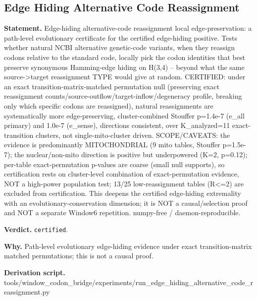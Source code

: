 \subsection{Edge Hiding Alternative Code Reassignment}\label{sec:bridge-edge-hiding-alternative-code-reassignment}
\textbf{Statement.} Edge-hiding alternative-code reassignment local edge-preservation: a path-level evolutionary
certificate for the certified edge-hiding positive. Tests whether natural NCBI alternative
genetic-code variants, when they reassign codons relative to the standard code, locally pick the
codon identities that best preserve synonymous Hamming-edge hiding on H(3,4) -- beyond what the same
source->target reassignment TYPE would give at random. CERTIFIED: under an exact
transition-matrix-matched permutation null (preserving exact reassignment
counts/source-outflow/target-inflow/degeneracy profile, breaking only which specific codons are
reassigned), natural reassignments are systematically more edge-preserving, cluster-combined
Stouffer p=1.4e-7 (e\_all primary) and 1.0e-7 (e\_sense), directions consistent, over K\_analyzed=11
exact-transition clusters, not single-mito-cluster driven. SCOPE/CAVEATS: the evidence is
predominantly MITOCHONDRIAL (9 mito tables, Stouffer p=1.5e-7); the nuclear/non-mito direction is
positive but underpowered (K=2, p=0.12); per-table exact-permutation p-values are coarse (small null
supports), so certification rests on cluster-level combination of exact-permutation evidence, NOT a
high-power population test; 13/25 low-reassignment tables (R<=2) are excluded from certification.
This deepens the certified edge-hiding extremality with an evolutionary-conservation dimension; it
is NOT a causal/selection proof and NOT a separate Window6 repetition. numpy-free /
daemon-reproducible.

\textbf{Verdict.} \texttt{certified}.

\textbf{Why.} Path-level evolutionary edge-hiding evidence under exact transition-matrix matched permutations;
this is not a causal proof.

\textbf{Derivation script.} tools/window\_codon\_bridge/experiments/run\_edge\_hiding\_alternative\_code\_reassignment.py

